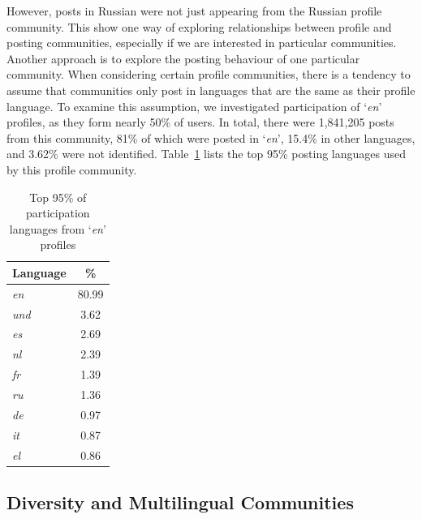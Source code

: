 \documentclass{llncs}
\begin{document}
{%

However, posts in Russian were not just appearing from the Russian profile
community. This show one way of exploring relationships between
profile and posting communities, especially if we are interested in
particular communities. Another approach is to explore the posting
behaviour of one particular community. When considering certain
profile communities, there is a tendency to assume that communities
only post in languages that are the same as their profile language. To
examine this assumption, we investigated participation of
`{\emph{en}}' profiles, as they form nearly 50\% of users. In total,
there were 1,841,205 posts from this community, 81\% of which were
posted in `{\emph{en}}', 15.4\% in other languages, and 3.62\% were
not identified. Table~\ref{tbl:enpartlangs} lists the top 95\% posting
languages used by this profile community.

\begin{table}[!htb]
\centering
\begin{tabular}{@{}lc}
\toprule
\textbf{Language} & \textbf{\%} \\ 
\midrule
{\emph{en}} & 80.99 \\
{\emph{und}} & 3.62 \\
{\emph{es}} & 2.69 \\
{\emph{nl}} & 2.39 \\
{\emph{fr}} & 1.39 \\
{\emph{ru}} & 1.36 \\
{\emph{de}} & 0.97 \\
{\emph{it}} & 0.87 \\ 
{\emph{el}} & 0.86 \\ 
\bottomrule
\end{tabular}
\caption{Top 95\% of participation languages from `{\emph{en}}' profiles}
\label{tbl:enpartlangs}
\end{table}

\subsection{Diversity and Multilingual Communities}

}
\end{document}
